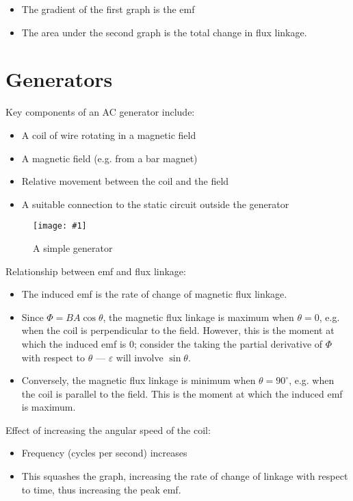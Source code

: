 \documentclass[a4paper,12pt]{article}
\let\oldsection\section
\renewcommand\section{\clearpage\oldsection}
\newcommand{\degsym}{^{\circ}}
\newcommand{\img}[4]{\begin{center}
  \begin{figure}[H]
    \centering
    \texttt{[image: \#1]}
    \caption{#3}
    \label{fig:#4}
  \end{figure}
\end{center}}
\begin{document}
\begin{itemize}
  \item The gradient of the first graph is the emf
  \item The area under the second graph is the total change in flux linkage.
\end{itemize}


\section{Generators}
Key components of an AC generator include:
\begin{itemize}
  \item A coil of wire rotating in a magnetic field
  \item A magnetic field (e.g. from a bar magnet)
  \item Relative movement between the coil and the field
  \item A suitable connection to the static circuit outside the generator
\end{itemize}

\img{generator.jpg}{1}{A simple generator}{generator}

Relationship between emf and flux linkage:

\begin{itemize}
  \item The induced emf is the rate of change of magnetic flux linkage.
  \item Since $\Phi = BA\cos\theta$, the magnetic flux linkage is maximum when $\theta = 0$, e.g. when the coil is perpendicular to the field. However, this is the moment at which the induced emf is 0; consider the taking the partial derivative of $\Phi$ with respect to $\theta$ --- $\varepsilon$ will involve $\sin\theta$.
  \item Conversely, the magnetic flux linkage is minimum when $\theta = 90\degsym$, e.g. when the coil is parallel to the field. This is the moment at which the induced emf is maximum.

\end{itemize}

Effect of increasing the angular speed of the coil:
\begin{itemize}
  \item Frequency (cycles per second) increases
  \item This squashes the graph, increasing the rate of change of linkage with respect to time, thus increasing the peak emf.
\end{itemize}
\end{document}
